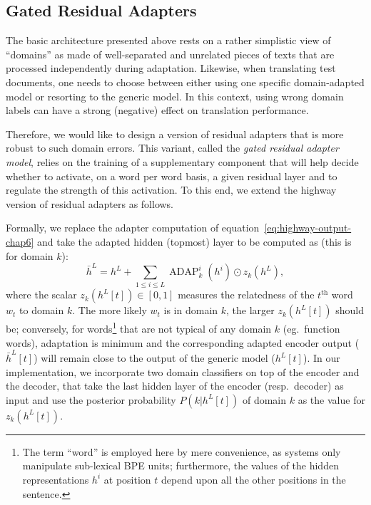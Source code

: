\subsection{Gated Residual Adapters \label{ssec:gate-chap6}}
The basic architecture presented above rests on a rather simplistic view of ``domains'' as made of well-separated and unrelated pieces of texts that are processed independently during adaptation. Likewise, when translating test documents, one needs to choose between either using one specific domain-adapted model or resorting to the generic model. In this context, using wrong domain labels can have a strong (negative) effect on translation performance. 

Therefore, we would like to design a version of residual adapters that is more robust to such domain errors. This variant, called the \emph{gated residual adapter model}, relies on the training of a supplementary component that will help decide whether to activate, on a word per word basis, a given residual layer and to regulate the strength of this activation. To this end, we extend the highway version of residual adapters as follows.

Formally, we replace the adapter computation of equation~\eqref{eq:highway-output-chap6} and take the adapted hidden (topmost) layer to be computed as (this is for domain $k$):
\begin{equation}
  \bar{h}^L = h^L + \displaystyle{\mathop{\sum}_{1 \leq i \leq L} \operatorname{ADAP}_k^i(h^i) \odot{} z_k(h^L)}, \label{eq:gated-output-chap6}
\end{equation}
where the scalar $z_k(h^L[t]) \in [0,1]$ measures the relatedness of the $t^{\text{th}}$ word $w_t$ to domain $k$. The more likely $w_t$ is in domain $k$, the larger $z_k(h^L[t])$ should be; conversely, for words\footnote{The term ``word'' is employed here by mere convenience, as systems only manipulate sub-lexical BPE units; furthermore, the values of the hidden representations $h^{i}$ at position $t$ depend upon all the other positions in the sentence.} that are not typical of any domain $k$ (eg.\ function words),  adaptation is minimum and the corresponding adapted encoder output ($\bar{h}^L[t]$) will remain close to the output of the generic model ($h^L[t]$). In our implementation, we incorporate two domain classifiers on top of the encoder and the decoder, that take the last hidden layer of the encoder (resp.\ decoder) as input and use the posterior probability $P(k|h^L[t])$ of domain $k$ as the value for $z_k(h^L[t])$.

